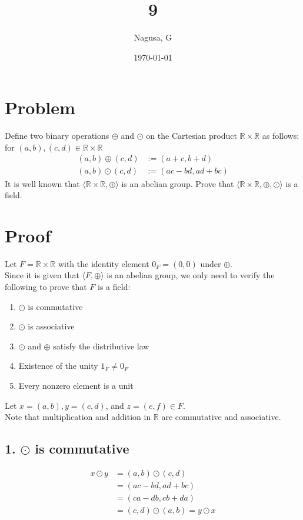 \documentclass[11pt, a4paper]{article}
\title{9}
\author{Nagusa, G}
\date{\today}
\begin{document}
\maketitle
\section*{Problem}
Define two binary operations $\oplus$ and $\odot$ on the Cartesian product $\mathbb{R}\times \mathbb{R}$ as follows:\\
for $(a,b), (c,d) \in \mathbb{R}\times \mathbb{R}$
\begin{align*}
    (a,b) \oplus (c,d) &:= (a+c, b+d) \\
    (a,b) \odot (c,d) &:= (ac-bd, ad+bc)
\end{align*}
It is well known that $\langle \mathbb{R} \times \mathbb{R}, \oplus \rangle$ is an abelian group.
Prove that $\langle \mathbb{R}\times \mathbb{R}, \oplus, \odot \rangle$ is a field.

\section*{Proof}
Let $F = \mathbb{R} \times \mathbb{R}$ with the identity element $0_F = (0,0)$ under $\oplus$.\\
Since it is given that $\langle F, \oplus \rangle$ is an abelian group,
we only need to verify the following to prove that $F$ is a field:
\begin{enumerate}
    \item $\odot$ is commutative
    \item $\odot$ is associative
    \item $\odot$ and $\oplus$ satisfy the distributive law
    \item Existence of the unity $1_F \neq 0_F$
    \item Every nonzero element is a unit
\end{enumerate}
Let $x = (a,b), y = (c,d)$, and $z = (e,f) \in F$.\\
Note that multiplication and addition in $\mathbb{R}$ are commutative and associative.

\subsection*{1. $\odot$ is commutative}
\begin{align*}
    x \odot y &= (a,b) \odot (c,d) \\
    &= (ac-bd, ad+bc) \\
    &= (ca-db, cb+da) \\
    &= (c,d) \odot (a,b) = y \odot x
\end{align*}
\end{document}
